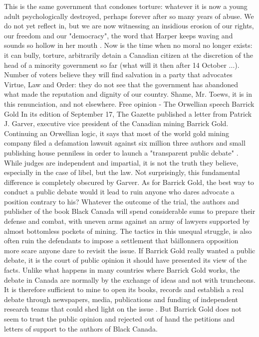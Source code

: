 This is the same government that condones torture: whatever it is now a young adult psychologically destroyed, perhaps forever after so many years of abuse.
We do not yet reflect in, but we are now witnessing an insidious erosion of our rights, our freedom and our "democracy", the word that Harper keeps waving and sounds so hollow in her mouth .
Now is the time when no moral no longer exists: it can bully, torture, arbitrarily detain a Canadian citizen at the discretion of the head of a minority government so far (what will it then after 14 October ...).
Number of voters believe they will find salvation in a party that advocates Virtue, Law and Order: they do not see that the government has abandoned what made the reputation and dignity of our country.
Shame, Mr. Toews, it is in this renunciation, and not elsewhere.
Free opinion - The Orwellian speech Barrick Gold
In its edition of September 17, The Gazette published a letter from Patrick J. Garver, executive vice president of the Canadian mining Barrick Gold.
Continuing an Orwellian logic, it says that most of the world gold mining company filed a defamation lawsuit against six million three authors and small publishing house penniless in order to launch a "transparent public debate" .
While judges are independent and impartial, it is not the truth they believe, especially in the case of libel, but the law.
Not surprisingly, this fundamental difference is completely obscured by Garver.
As for Barrick Gold, the best way to conduct a public debate would it lead to ruin anyone who dares advocate a position contrary to his?
Whatever the outcome of the trial, the authors and publisher of the book Black Canada will spend considerable sums to prepare their defense and combat, with uneven arms against an army of lawyers supported by almost bottomless pockets of mining.
The tactics in this unequal struggle, is also often ruin the defendants to impose a settlement that bâillonnera opposition more scare anyone dare to revisit the issue.
If Barrick Gold really wanted a public debate, it is the court of public opinion it should have presented its view of the facts.
Unlike what happens in many countries where Barrick Gold works, the debate in Canada are normally by the exchange of ideas and not with truncheons.
It is therefore sufficient to mine to open its books, records and establish a real debate through newspapers, media, publications and funding of independent research teams that could shed light on the issue .
But Barrick Gold does not seem to trust the public opinion and rejected out of hand the petitions and letters of support to the authors of Black Canada.
